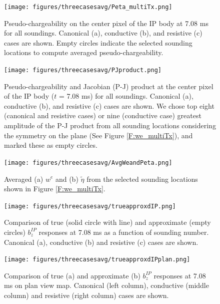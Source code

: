 \documentclass[a4paper, 11pt]{article}
\newcommand{\peta}{\tilde{\eta}}
\begin{document}
\begin{figure}[htb]
  \centering  \texttt{[image: figures/threecasesavg/Peta\_multiTx.png]}
  \caption{Pseudo-chargeability on the center pixel of the IP body at 7.08 ms for all soundings. Canonical (a), conductive (b), and resistive (c) cases are shown. Empty circles indicate the selected sounding locations to compute averaged pseudo-chargeability.}
  \label{F:Peta_multiTx}
\end{figure}
\begin{figure}[htb]
  \centering  \texttt{[image: figures/threecasesavg/PJproduct.png]}
  \caption{Pseudo-chargeability and Jacobian (P-J) product at the center pixel of the IP body ($t$ = 7.08 ms) for all soundings. Canonical (a), conductive (b), and resistive (c) cases are shown. We chose top eight (canonical and resistive cases) or nine (conductive case) greatest amplitude of the P-J product from all sounding locations considering the symmetry on the plane (See Figure \ref{F:we_multiTx}), and marked these as empty circles. }
  \label{F:PJproduct}
\end{figure}

\begin{figure}[htb]
  \centering \texttt{[image: figures/threecasesavg/AvgWeandPeta.png]}
  \caption{Averaged (a) $w^e$ and (b) $\peta$ from the selected sounding locations shown in Figure \ref{F:we_multiTx}.}
  \label{F:AvgWeandPeta}
\end{figure}

\begin{figure}[htb]
  \centering \texttt{[image: figures/threecasesavg/trueapproxdIP.png]}
  \caption{Comparison of true (solid circle with line) and approximate (empty circles) $b_z^{IP}$ responses at 7.08 ms as a function of sounding number. Canonical (a), conductive (b) and resistive (c) cases are shown. }
  \label{F:trueapproxdIP}
\end{figure}

\begin{figure}[htb]
  \centering \texttt{[image: figures/threecasesavg/trueapproxdIPplan.png]}
  \caption{Comparison of true (a) and approximate (b) $b_z^{IP}$ responses at 7.08 ms on plan view map. Canonical (left column), conductive (middle column) and resistive (right column) cases are shown.}
  \label{F:trueapproxdIPplan}
\end{figure}
\clearpage

\end{document}
